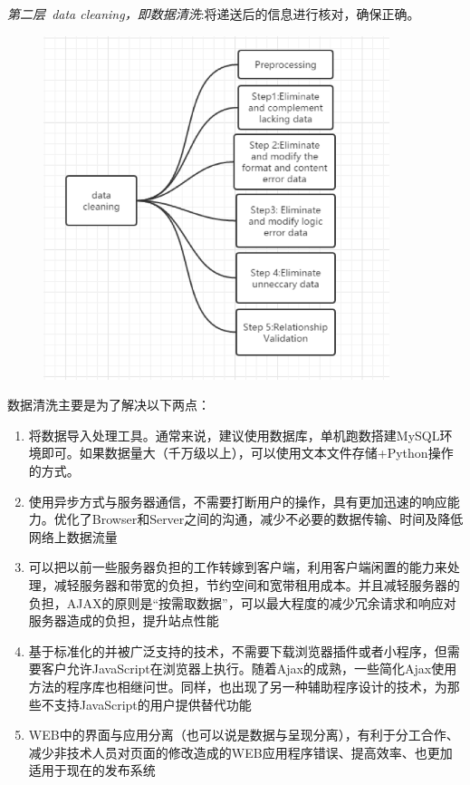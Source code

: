 \documentclass[UTF8]{ctexart}
\begin{document}
\emph{第二层~data cleaning，即数据清洗}:将递送后的信息进行核对，确保正确。\\
\begin{figure}[H]
\centering
\includegraphics[width = 0.9\textwidth]{data-cleaning-df.png}
\end{figure}
数据清洗主要是为了解决以下两点：\\
\begin{enumerate}[1)]
\item 将数据导入处理工具。通常来说，建议使用数据库，单机跑数搭建MySQL环境即可。如果数据量大（千万级以上），可以使用文本文件存储+Python操作的方式。
\item 使用异步方式与服务器通信，不需要打断用户的操作，具有更加迅速的响应能力。优化了Browser和Server之间的沟通，减少不必要的数据传输、时间及降低网络上数据流量
\item 可以把以前一些服务器负担的工作转嫁到客户端，利用客户端闲置的能力来处理，减轻服务器和带宽的负担，节约空间和宽带租用成本。并且减轻服务器的负担，AJAX的原则是“按需取数据”，可以最大程度的减少冗余请求和响应对服务器造成的负担，提升站点性能
\item 基于标准化的并被广泛支持的技术，不需要下载浏览器插件或者小程序，但需要客户允许JavaScript在浏览器上执行。随着Ajax的成熟，一些简化Ajax使用方法的程序库也相继问世。同样，也出现了另一种辅助程序设计的技术，为那些不支持JavaScript的用户提供替代功能
\item WEB中的界面与应用分离（也可以说是数据与呈现分离），有利于分工合作、减少非技术人员对页面的修改造成的WEB应用程序错误、提高效率、也更加适用于现在的发布系统
\end{enumerate}
\end{document}
